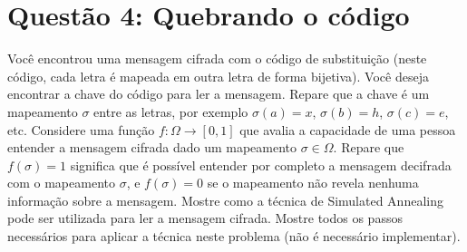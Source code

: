 \section*{Questão 4: Quebrando o código}

Você encontrou uma mensagem cifrada com o código de substituição (neste código, cada letra é mapeada em outra letra de forma bijetiva). Você deseja encontrar a chave do código para ler a mensagem. Repare que a chave é um mapeamento $\sigma$ entre as letras, por exemplo $\sigma(a) = x$, $\sigma(b) = h$, $\sigma(c) = e$, etc. Considere uma função $f : \Omega \rightarrow [0,1]$ que avalia a capacidade de uma pessoa entender a mensagem cifrada dado um mapeamento $\sigma \in \Omega$. Repare que $f(\sigma) = 1$ significa que é possível entender por completo a mensagem decifrada com o mapeamento $\sigma$, e $f(\sigma) = 0$ se o mapeamento não revela nenhuma informação sobre a mensagem. Mostre como a técnica de Simulated Annealing pode ser utilizada para ler a mensagem cifrada. Mostre todos os passos necessários para aplicar a técnica neste problema (não é necessário implementar).
